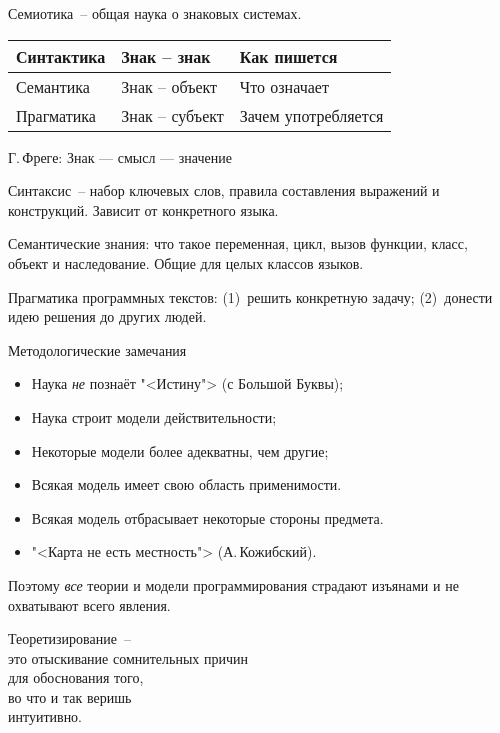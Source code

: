 \documentclass[landscape]{slides}
\begin{document}
\begin{slide}
Семиотика~-- общая наука о знаковых системах.

\begin{center}
\begin{tabular}{|l|l|l|}
        \hline
        Синтактика & Знак -- знак    & Как пишется         \\ \hline
        Семантика  & Знак -- объект  & Что означает        \\ \hline
        Прагматика & Знак -- субъект & Зачем употребляется \\ \hline
\end{tabular}
\end{center}

Г.\,Фреге: Знак --- смысл --- значение

Синтаксис~-- набор ключевых слов, правила составления выражений и конструкций. Зависит от конкретного языка.

Семантические знания: что такое переменная, цикл, вызов функции, класс, объект и наследование. Общие для целых классов языков.

Прагматика программных текстов: (1)~решить конкретную задачу; (2)~донести идею решения до других людей.
\end{slide}

\begin{slide}
Методологические замечания
\begin{itemize}
\item Наука \emph{не} познаёт "<Истину"> (с Большой Буквы);
\item Наука строит модели действительности;
\item Некоторые модели более адекватны, чем другие;
\item Всякая модель имеет свою область применимости.
\item Всякая модель отбрасывает некоторые стороны предмета.
\item "<Карта не есть местность"> (А.\,Кожибский).
\end{itemize}
Поэтому \emph{все} теории и модели программирования страдают изъянами и
не охватывают всего явления.
\end{slide}

\begin{slide}
    \begin{center}
        \begin{LARGE}
            Теоретизирование~--\\это отыскивание сомнительных причин\\для обоснования того,\\во что и так веришь\\интуитивно.
        \end{LARGE}
    \end{center}
\end{slide}
\end{document}
